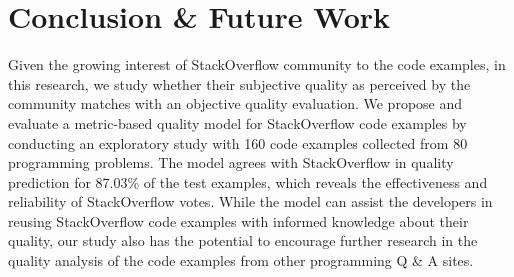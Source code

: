 \documentclass[conference]{IEEEtran}
\begin{document}
\section{Conclusion \& Future Work\vspace{-.1cm}}
\label{sec:conclusion}
Given the growing interest of StackOverflow community to the code examples, in this research, we study whether their subjective quality as perceived by the community matches with an objective quality evaluation. We propose and evaluate a metric-based quality model for StackOverflow code examples by conducting an 
exploratory study with 160 code examples collected from 80 programming problems. The model agrees with StackOverflow in quality prediction for 87.03\% of the test examples, which reveals the effectiveness and reliability of StackOverflow votes. 
While the model can assist the developers in reusing StackOverflow code examples with informed knowledge about their quality, our study also has the potential to encourage further research in the quality analysis of the code examples from other programming Q \& A sites.



\setlength{\bibsep}{0pt plus 0.3ex}
\scriptsize
%
%
\end{document}
